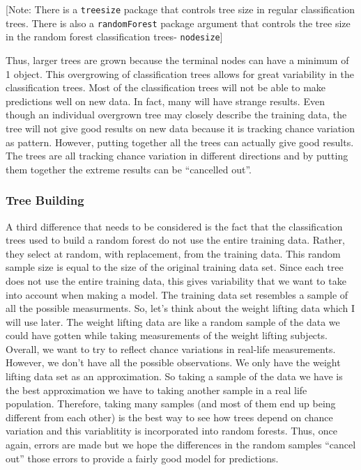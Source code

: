 \documentclass[12pt,twoside]{reedthesis}
\begin{document}
  {[}Note: There is a \texttt{treesize} package that controls tree size in
  regular classification trees. There is also a \texttt{randomForest}
  package argument that controls the tree size in the random forest
  classification trees- \texttt{nodesize}{]}
  
  Thus, larger trees are grown because the terminal nodes can have a
  minimum of 1 object. This overgrowing of classification trees allows for
  great variability in the classification trees. Most of the
  classification trees will not be able to make predictions well on new
  data. In fact, many will have strange results. Even though an individual
  overgrown tree may closely describe the training data, the tree will not
  give good results on new data because it is tracking chance variation as
  pattern. However, putting together all the trees can actually give good
  results. The trees are all tracking chance variation in different
  directions and by putting them together the extreme results can be
  ``cancelled out''.
  
  \subsubsection{Tree Building}\label{tree-building}
  
  A third difference that needs to be considered is the fact that the
  classification trees used to build a random forest do not use the entire
  training data. Rather, they select at random, with replacement, from the
  training data. This random sample size is equal to the size of the
  original training data set. Since each tree does not use the entire
  training data, this gives variability that we want to take into account
  when making a model. The training data set resembles a sample of all the
  possible measurments. So, let's think about the weight lifting data
  which I will use later. The weight lifting data are like a random sample
  of the data we could have gotten while taking measurements of the weight
  lifting subjects. Overall, we want to try to reflect chance variations
  in real-life measurements. However, we don't have all the possible
  observations. We only have the weight lifting data set as an
  approximation. So taking a sample of the data we have is the best
  approximation we have to taking another sample in a real life
  population. Therefore, taking many samples (and most of them end up
  being different from each other) is the best way to see how trees depend
  on chance variation and this variablitity is incorporated into random
  forests. Thus, once again, errors are made but we hope the differences
  in the random samples ``cancel out'' those errors to provide a fairly
  good model for predictions.
  
\end{document}
